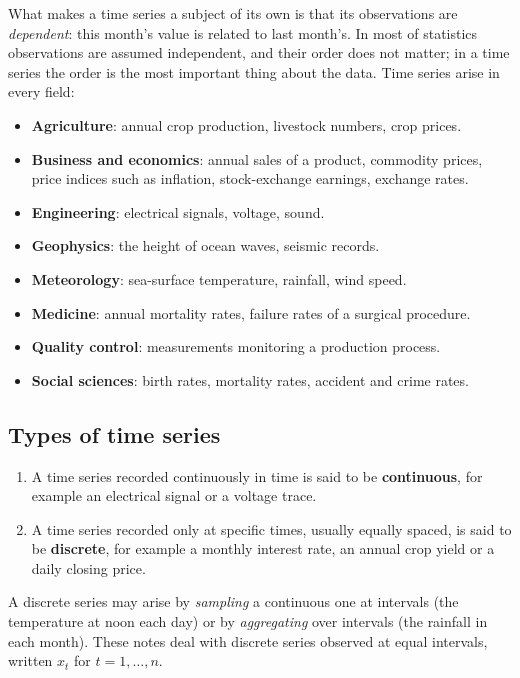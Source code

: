 \documentclass[11pt,a4paper]{article}
\theoremstyle{definition}
\begin{document}
What makes a time series a subject of its own is that its observations are \emph{dependent}: this month's
value is related to last month's. In most of statistics observations are assumed independent, and their order
does not matter; in a time series the order is the most important thing about the data. Time series arise in
every field:
\begin{itemize}
\item \textbf{Agriculture}: annual crop production, livestock numbers, crop prices.
\item \textbf{Business and economics}: annual sales of a product, commodity prices, price indices such as
inflation, stock-exchange earnings, exchange rates.
\item \textbf{Engineering}: electrical signals, voltage, sound.
\item \textbf{Geophysics}: the height of ocean waves, seismic records.
\item \textbf{Meteorology}: sea-surface temperature, rainfall, wind speed.
\item \textbf{Medicine}: annual mortality rates, failure rates of a surgical procedure.
\item \textbf{Quality control}: measurements monitoring a production process.
\item \textbf{Social sciences}: birth rates, mortality rates, accident and crime rates.
\end{itemize}

\subsection{Types of time series}
\begin{enumerate}
\item A time series recorded continuously in time is said to be \textbf{continuous}, for example an electrical
signal or a voltage trace.
\item A time series recorded only at specific times, usually equally spaced, is said to be \textbf{discrete}, for
example a monthly interest rate, an annual crop yield or a daily closing price.
\end{enumerate}
A discrete series may arise by \emph{sampling} a continuous one at intervals (the temperature at noon each
day) or by \emph{aggregating} over intervals (the rainfall in each month). These notes deal with discrete series
observed at equal intervals, written $x_t$ for $t = 1, \dots, n$.
\end{document}

